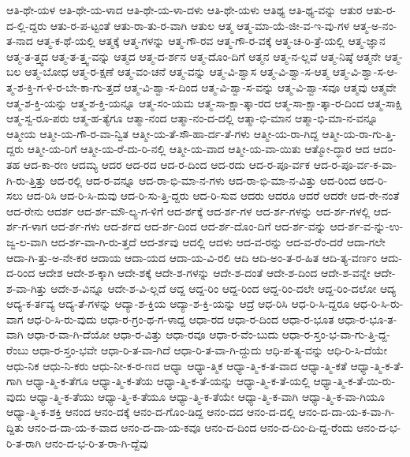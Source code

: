 {ಆತಿ-ಥೇ-ಯಳ
ಆತಿ-ಥೇ-ಯ-ಳಾದ
ಆತಿ-ಥೇ-ಯ-ಳಾ-ದಳು
ಆತಿ-ಥೇ-ಯಳು
ಆತಿಥ್ಯ
ಆತಿ-ಥ್ಯ-ವನ್ನು
ಆತುರ
ಆತು-ರ-ದ-ಲ್ಲಿ-ದ್ದರು
ಆತು-ರ-ಪ-ಟ್ಟಂತೆ
ಆತು-ರಾ-ತು-ರ-ವಾಗಿ
ಆತುಲ
ಆತ್ಮ
ಆತ್ಮ-ಮಾ-ಯೆ-ಜೀ-ವ-ಇ-ವು-ಗಳ
ಆತ್ಮ-ಅ-ನಂ-ತ-ನಾದ
ಆತ್ಮ-ಕ-ಥೆ-ಯಲ್ಲಿ
ಆತ್ಮಕ್ಕೆ
ಆತ್ಮ-ಗಳನ್ನು
ಆತ್ಮ-ಗೌ-ರವ
ಆತ್ಮ-ಗೌ-ರ-ವಕ್ಕೆ
ಆತ್ಮ-ಚ-ರಿ-ತ್ರೆ-ಯಲ್ಲಿ
ಆತ್ಮ-ಜ್ಞಾನ
ಆತ್ಮ-ತ-ತ್ತ್ವದ
ಆತ್ಮ-ತ-ತ್ತ್ವ-ವನ್ನು
ಆತ್ಮದ
ಆತ್ಮ-ದ-ರ್ಶನ
ಆತ್ಮ-ದೊಂ-ದಿಗೆ
ಆತ್ಮನ
ಆತ್ಮ-ನ-ಲ್ಲವೆ
ಆತ್ಮ-ನಿಷ್ಠೆ
ಆತ್ಮನೇ
ಆತ್ಮ-ಬಲ
ಆತ್ಮ-ಬೋಧ
ಆತ್ಮ-ರ-ಕ್ಷಣೆ
ಆತ್ಮ-ವಂ-ಚನೆ
ಆತ್ಮ-ವನ್ನು
ಆತ್ಮ-ವಿ-ಶ್ವಾಸ
ಆತ್ಮ-ವಿ-ಶ್ವಾ-ಸ-ಆತ್ಮ
ಆತ್ಮ-ವಿ-ಶ್ವಾ-ಸ-ಆ-ತ್ಮ-ಶ-ಕ್ತಿ-ಗ-ಳಿ-ರ-ಬೇ-ಕಾ-ಗು-ತ್ತದೆ
ಆತ್ಮ-ವಿ-ಶ್ವಾ-ಸ-ದಿಂದ
ಆತ್ಮ-ವಿ-ಶ್ವಾ-ಸ-ವನ್ನು
ಆತ್ಮ-ವಿ-ಶ್ವಾ-ಸವೂ
ಆತ್ಮವು
ಆತ್ಮವೇ
ಆತ್ಮ-ಶ-ಕ್ತಿ-ಯನ್ನು
ಆತ್ಮ-ಶ-ಕ್ತಿ-ಯನ್ನೂ
ಆತ್ಮ-ಸಂ-ಯಮ
ಆತ್ಮ-ಸಾ-ಕ್ಷಾ-ತ್ಕಾ-ರದ
ಆತ್ಮ-ಸಾ-ಕ್ಷಾ-ತ್ಕಾ-ರ-ದಿಂದ
ಆತ್ಮ-ಸಾಕ್ಷಿ
ಆತ್ಮ-ಸ್ವ-ರೂ-ಪರು
ಆತ್ಮ-ಹ-ತ್ಯೆಗೂ
ಆತ್ಮಾ-ನಂದ
ಆತ್ಮಾ-ನಂ-ದ-ದಲ್ಲಿ
ಆತ್ಮಾ-ಭಿ-ಮಾನ
ಆತ್ಮಾ-ಭಿ-ಮಾ-ನ-ವನ್ನೂ
ಆತ್ಮೀಯ
ಆತ್ಮೀ-ಯ-ಗೌ-ರ-ವಾ-ನ್ವಿತ
ಆತ್ಮೀ-ಯ-ತೆ-ಸೌ-ಹಾ-ರ್ದ-ತೆ-ಗಳು
ಆತ್ಮೀ-ಯ-ರಾ-ಗಿದ್ದ
ಆತ್ಮೀ-ಯ-ರಾ-ಗು-ತ್ತಿ-ದ್ದರು
ಆತ್ಮೀ-ಯ-ರಿಗೆ
ಆತ್ಮೀ-ಯ-ರೆ-ದು-ರಿ-ನಲ್ಲಿ
ಆತ್ಮೀ-ಯ-ವಾದ
ಆತ್ಮೀ-ಯ-ವಾ-ಯಿತು
ಆತ್ಮೋ-ದ್ಧಾರ
ಆದ
ಆದಂ-ತಹ
ಆದ-ಕಾ-ರಣ
ಆದಮ್ಯ
ಆದರ
ಆದ-ರದ
ಆದ-ರ-ದಿಂದ
ಆದ-ರದು
ಆದ-ರ-ಪೂ-ರ್ವಕ
ಆದ-ರ-ಪೂ-ರ್ವ-ಕ-ವಾ-ಗಿ-ರು-ತ್ತಿತ್ತು
ಆದ-ರಲ್ಲಿ
ಆದ-ರ-ವನ್ನೂ
ಆದ-ರಾ-ಭಿ-ಮಾ-ನ-ಗಳು
ಆದ-ರಾ-ಭಿ-ಮಾ-ನ-ವಿತ್ತು
ಆದ-ರಿಂದ
ಆದ-ರಿ-ಸಲು
ಆದ-ರಿಸಿ
ಆದ-ರಿ-ಸಿ-ದುವು
ಆದ-ರಿ-ಸು-ತ್ತಿ-ದ್ದರು
ಆದ-ರಿ-ಸುವ
ಆದರು
ಆದರೂ
ಆದರೆ
ಆದರೇ
ಆದ-ರೇ-ನಂತೆ
ಆದ-ರೇನು
ಆದರ್ಶ
ಆದ-ರ್ಶ-ಮೌ-ಲ್ಯ-ಗ-ಳಿಗೆ
ಆದ-ರ್ಶಕ್ಕೆ
ಆದ-ರ್ಶ-ಗಳ
ಆದ-ರ್ಶ-ಗಳನ್ನು
ಆದ-ರ್ಶ-ಗಳಲ್ಲಿ
ಆದ-ರ್ಶ-ಗ-ಳಾಗ
ಆದ-ರ್ಶ-ಗಳು
ಆದ-ರ್ಶದ
ಆದ-ರ್ಶ-ದಿಂದ
ಆದ-ರ್ಶ-ದೊಂ-ದಿಗೆ
ಆದ-ರ್ಶ-ವನ್ನು
ಆದ-ರ್ಶ-ವ-ನ್ನು-ಉ-ಜ್ವ-ಲ-ವಾಗಿ
ಆದ-ರ್ಶ-ವಾ-ಗಿ-ರು-ತ್ತದೆ
ಆದ-ರ್ಶವು
ಆದಲ್ಲಿ
ಆದಳು
ಆದ-ವ-ರನ್ನು
ಆದ-ವ-ರೆಂ-ದರೆ
ಆದಾ-ಗಲೇ
ಆದಾ-ಗಿ-ತ್ತು-ಅ-ನೇ-ಕರ
ಆದಾಯ
ಆದಾ-ಯದ
ಆದಾ-ಯ-ವಿ-ರಲಿ
ಆದಿ
ಆದಿ-ಅಂ-ತ-ರ-ಹಿತ
ಆದಿ-ತ್ಯ-ವರ್ಣಂ
ಆದು-ದ-ರಿಂದ
ಆದೇಶ
ಆದೇ-ಶ-ಕ್ಕಾಗಿ
ಆದೇ-ಶಕ್ಕೆ
ಆದೇ-ಶ-ಗಳನ್ನು
ಆದೇ-ಶ-ದಂತೆ
ಆದೇ-ಶ-ದಿಂದ
ಆದೇ-ಶ-ವನ್ನೇ
ಆದೇ-ಶ-ವಾ-ಗಿತ್ತು
ಆದೇ-ಶ-ವಿನ್ನೂ
ಆದೇ-ಶ-ವಿ-ಲ್ಲದೆ
ಆದ್ದ
ಆದ್ದ-ರಿಂ
ಆದ್ದ-ರಿಂದ
ಆದ್ದ-ರಿಂ-ದಲೇ
ಆದ್ದ-ರಿಂ-ದಲೋ
ಆದ್ಯ
ಆದ್ಯ-ಕ-ರ್ತವ್ಯ
ಆದ್ಯ-ತೆ-ಗಳನ್ನು
ಆದ್ಯಾ-ಶ-ಕ್ತಿಯ
ಆದ್ಯಾ-ಶ-ಕ್ತಿ-ಯನ್ನು
ಆದ್ರೆ
ಆಧ-ರಿಸಿ
ಆಧ-ರಿ-ಸಿ-ದ್ದರೂ
ಆಧ-ರಿ-ಸಿ-ರು-ವಾಗ
ಆಧ-ರಿ-ಸಿ-ರು-ವುದು
ಆಧಾ-ರ-ಗ್ರಂ-ಥ-ಗ-ಳಾದ್ದ
ಆಧಾ-ರದ
ಆಧಾ-ರ-ದಿಂದ
ಆಧಾ-ರ-ಭೂತ
ಆಧಾ-ರ-ಭೂ-ತ-ವಾಗಿ
ಆಧಾ-ರ-ವಾ-ಗಿ-ದೆಯೋ
ಆಧಾ-ರ-ವಿತ್ತು
ಆಧಾ-ರವೂ
ಆಧಾ-ರ-ವೆಂ-ಬುದು
ಆಧಾ-ರ-ಸ್ತಂ-ಭ-ವಾ-ಗು-ತ್ತಿ-ದ್ದ-ರೆಂಬು
ಆಧಾ-ರ-ಸ್ತಂ-ಭವೇ
ಆಧಾ-ರಿ-ತ-ವಾ-ಗಿದೆ
ಆಧಾ-ರಿ-ತ-ವಾ-ಗಿ-ದ್ದುದು
ಆಧಿ-ಪ-ತ್ಯ-ವನ್ನು
ಆಧಿ-ರಿ-ಸಿ-ದೆಯೇ
ಆಧು-ನಿಕ
ಆಧು-ನಿ-ಕರು
ಆಧು-ನೀ-ಕ-ರ-ಣದ
ಆಧ್ಯಾ
ಆಧ್ಯಾ-ತ್ಮಿಕ
ಆಧ್ಯಾ-ತ್ಮಿ-ಕ-ತ-ವಾದ
ಆಧ್ಯಾ-ತ್ಮಿ-ಕತೆ
ಆಧ್ಯಾ-ತ್ಮಿ-ಕ-ತೆ-ಗಾಗಿ
ಆಧ್ಯಾ-ತ್ಮಿ-ಕ-ತೆಗೂ
ಆಧ್ಯಾ-ತ್ಮಿ-ಕ-ತೆಯ
ಆಧ್ಯಾ-ತ್ಮಿ-ಕ-ತೆ-ಯನ್ನು
ಆಧ್ಯಾ-ತ್ಮಿ-ಕ-ತೆ-ಯಲ್ಲಿ
ಆಧ್ಯಾ-ತ್ಮಿ-ಕ-ತೆ-ಯಿ-ರು-ವುದು
ಆಧ್ಯಾ-ತ್ಮಿ-ಕ-ತೆಯು
ಆಧ್ಯಾ-ತ್ಮಿ-ಕ-ತೆಯೂ
ಆಧ್ಯಾ-ತ್ಮಿ-ಕ-ತೆಯೇ
ಆಧ್ಯಾ-ತ್ಮಿ-ಕ-ವಾಗಿ
ಆಧ್ಯಾ-ತ್ಮಿ-ಕ-ವಾ-ಗಿಯೂ
ಆಧ್ಯಾ-ತ್ಮಿ-ಕ-ಶಕ್ತಿ
ಆನಂದ
ಆನಂ-ದಕ್ಕೆ
ಆನಂ-ದ-ಗೊಂ-ಡಿದ್ದ
ಆನಂ-ದದ
ಆನಂ-ದ-ದಲ್ಲಿ
ಆನಂ-ದ-ದಾ-ಯ-ಕ-ವಾ-ಗಿ-ದ್ದಿತು
ಆನಂ-ದ-ದಾ-ಯ-ಕ-ವಾದ
ಆನಂ-ದ-ದಾ-ಯ-ಕವೂ
ಆನಂ-ದ-ದಿಂದ
ಆನಂ-ದ-ದಿಂ-ದಿ-ದ್ದ-ರೆಂದು
ಆನಂ-ದ-ಭ-ರಿ-ತ-ರಾಗಿ
ಆನಂ-ದ-ಭ-ರಿ-ತ-ರಾ-ಗಿ-ದ್ದೆವು
}
